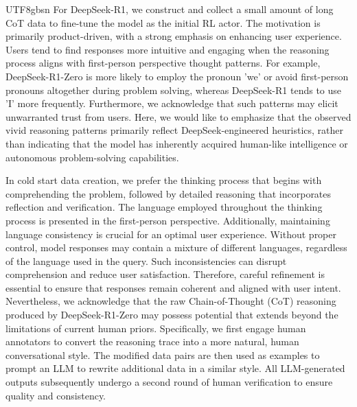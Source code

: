 \documentclass[11pt, a4paper, logo, copyright, nonumbering]{deepseek}
\begin{document}
\begin{CJK*}{UTF8}{gbsn}
For DeepSeek-R1, we construct and collect a small amount of long CoT data to fine-tune the model as the initial RL actor. The motivation is primarily product-driven, with a strong emphasis on enhancing user experience. Users tend to find responses more intuitive and engaging when the reasoning process aligns with first-person perspective thought patterns. For example, DeepSeek-R1-Zero is more likely to employ the pronoun 'we' or avoid first-person pronouns altogether during problem solving, whereas DeepSeek-R1 tends to use 'I' more frequently. Furthermore, we acknowledge that such patterns may elicit unwarranted trust from users. Here, we would like to emphasize that the observed vivid reasoning patterns primarily reflect DeepSeek-engineered heuristics, rather than indicating that the model has inherently acquired human-like intelligence or autonomous problem-solving capabilities.

In cold start data creation, we prefer the thinking process that begins with comprehending the problem, followed by detailed reasoning that incorporates reflection and verification. The language employed throughout the thinking process is presented in the first-person perspective.   Additionally, maintaining language consistency is crucial for an optimal user experience. Without proper control, model responses may contain a mixture of different languages, regardless of the language used in the query. Such inconsistencies can disrupt comprehension and reduce user satisfaction. Therefore, careful refinement is essential to ensure that responses remain coherent and aligned with user intent. Nevertheless, we acknowledge that the raw Chain-of-Thought (CoT) reasoning produced by DeepSeek-R1-Zero may possess potential that extends beyond the limitations of current human priors.
Specifically, we first engage human annotators to convert the reasoning trace into a more natural, human conversational style. The modified data pairs are then used as examples to prompt an LLM to rewrite additional data in a similar style. All LLM-generated outputs subsequently undergo a second round of human verification to ensure quality and consistency.




\end{CJK*}
\end{document}
